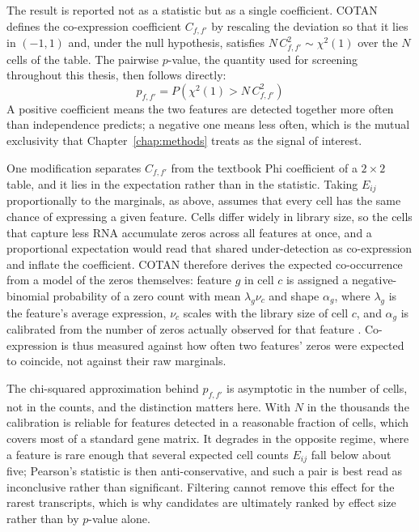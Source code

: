 The result is reported not as a statistic but as a single coefficient. COTAN defines the co-expression coefficient $C_{f,f'}$ by rescaling the deviation so that it lies in $(-1, 1)$ and, under the null hypothesis, satisfies $N\,C_{f,f'}^2 \sim \chi^2(1)$ over the $N$ cells of the table. The pairwise $p$-value, the quantity used for screening throughout this thesis, then follows directly:
$$ p_{f,f'} = P\!\left(\chi^2(1) > N\,C_{f,f'}^2\right) $$
A positive coefficient means the two features are detected together more often than independence predicts; a negative one means less often, which is the mutual exclusivity that Chapter~\ref{chap:methods} treats as the signal of interest.

One modification separates $C_{f,f'}$ from the textbook Phi coefficient of a $2 \times 2$ table, and it lies in the expectation rather than in the statistic. Taking $E_{ij}$ proportionally to the marginals, as above, assumes that every cell has the same chance of expressing a given feature. Cells differ widely in library size, so the cells that capture less RNA accumulate zeros across all features at once, and a proportional expectation would read that shared under-detection as co-expression and inflate the coefficient. COTAN therefore derives the expected co-occurrence from a model of the zeros themselves: feature $g$ in cell $c$ is assigned a negative-binomial probability of a zero count with mean $\lambda_g \nu_c$ and shape $\alpha_g$, where $\lambda_g$ is the feature's average expression, $\nu_c$ scales with the library size of cell $c$, and $\alpha_g$ is calibrated from the number of zeros actually observed for that feature \cite{galfre2021cotan}. Co-expression is thus measured against how often two features' zeros were expected to coincide, not against their raw marginals.

The chi-squared approximation behind $p_{f,f'}$ is asymptotic in the number of cells, not in the counts, and the distinction matters here. With $N$ in the thousands the calibration is reliable for features detected in a reasonable fraction of cells, which covers most of a standard gene matrix. It degrades in the opposite regime, where a feature is rare enough that several expected cell counts $E_{ij}$ fall below about five; Pearson's statistic is then anti-conservative, and such a pair is best read as inconclusive rather than significant. Filtering cannot remove this effect for the rarest transcripts, which is why candidates are ultimately ranked by effect size rather than by $p$-value alone.

